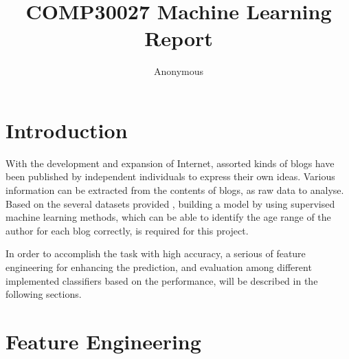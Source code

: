 \documentclass[11pt]{article}
\title{COMP30027 Machine Learning Report}
\author
{Anonymous}
\begin{document}
\maketitle


\section{Introduction}
With the development and expansion of Internet, assorted kinds of blogs have been published by independent individuals to express their own ideas. Various information can be extracted from the contents of blogs, as raw data to analyse. Based on the several datasets provided \cite{Sch06}, building a model by using supervised machine learning methods, which can be able to identify the age range of the author for each blog correctly, is required for this project.

In order to accomplish the task with high accuracy, a serious of feature engineering for enhancing the prediction, and evaluation among different implemented classifiers based on the performance, will be described in the following sections.

\section{Feature Engineering}
\end{document}
